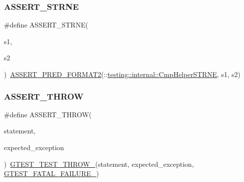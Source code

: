 \subsubsection{\texorpdfstring{ASSERT\_STRNE}{ASSERT\_STRNE}}
{\footnotesize\ttfamily \#define A\+S\+S\+E\+R\+T\+\_\+\+S\+T\+R\+NE(\begin{DoxyParamCaption}\item[{}]{s1,  }\item[{}]{s2 }\end{DoxyParamCaption})~\mbox{\hyperlink{_obj__test_2lib_2googletest-release-1_88_81_2googletest_2include_2gtest_2gtest__pred__impl_8h_ac452685a1a98ea3d96eb956a062ee210}{A\+S\+S\+E\+R\+T\+\_\+\+P\+R\+E\+D\+\_\+\+F\+O\+R\+M\+A\+T2}}(\+::\mbox{\hyperlink{namespacetesting_1_1internal_af2d31c77ce73e1003a64bd7ca3564bbe}{testing\+::internal\+::\+Cmp\+Helper\+S\+T\+R\+NE}}, s1, s2)}

\mbox{\label{googletest-master_2googletest_2include_2gtest_2gtest_8h_aedb1eddae6c2a2430b0e7b7e03b4f052}} 
\subsubsection{\texorpdfstring{ASSERT\_THROW}{ASSERT\_THROW}}
{\footnotesize\ttfamily \#define A\+S\+S\+E\+R\+T\+\_\+\+T\+H\+R\+OW(\begin{DoxyParamCaption}\item[{}]{statement,  }\item[{}]{expected\+\_\+exception }\end{DoxyParamCaption})~\mbox{\hyperlink{_obj__test_2lib_2googletest-release-1_88_81_2googletest_2include_2gtest_2internal_2gtest-internal_8h_a3f71db93eaf30b0cfca9612b9ac32106}{G\+T\+E\+S\+T\+\_\+\+T\+E\+S\+T\+\_\+\+T\+H\+R\+O\+W\+\_\+}}(statement, expected\+\_\+exception, \mbox{\hyperlink{_obj__test_2lib_2googletest-release-1_88_81_2googletest_2include_2gtest_2internal_2gtest-internal_8h_a0f9a4c3ea82cc7bf4478eaffdc168358}{G\+T\+E\+S\+T\+\_\+\+F\+A\+T\+A\+L\+\_\+\+F\+A\+I\+L\+U\+R\+E\+\_\+}})}

\mbox{\label{googletest-master_2googletest_2include_2gtest_2gtest_8h_ae9244bfbda562e8b798789b001993fa5}} 
